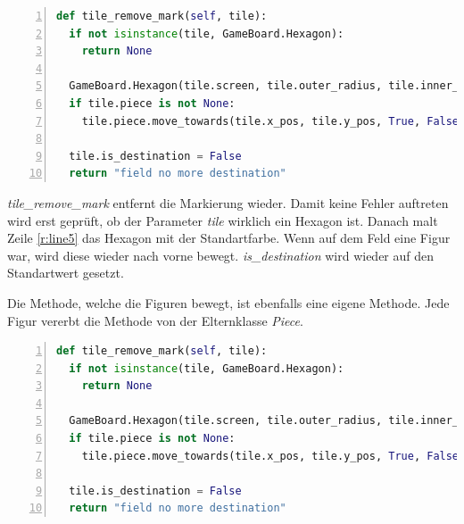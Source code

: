 \begin{lstlisting}[language=python,caption={Markierung aufheben},captionpos=b,label={lst:hexa:aufheben},numbers=left,frame=none,escapechar=|]
def tile_remove_mark(self, tile):
  if not isinstance(tile, GameBoard.Hexagon):
    return None

  GameBoard.Hexagon(tile.screen, tile.outer_radius, tile.inner_radius,tile.x_pos, tile.y_pos)|\label{r:line5}|
  if tile.piece is not None:
    tile.piece.move_towards(tile.x_pos, tile.y_pos, True, False)

  tile.is_destination = False
  return "field no more destination"
\end{lstlisting}

\textit{tile\_remove\_mark} entfernt die Markierung wieder. Damit keine Fehler auftreten wird erst geprüft, ob der Parameter \textit{tile} wirklich ein Hexagon ist. Danach malt Zeile \ref{r:line5} das Hexagon mit der Standartfarbe. Wenn auf dem Feld eine Figur war, wird diese wieder nach vorne bewegt. \textit{is\_destination} wird wieder auf den Standartwert gesetzt.

Die Methode, welche die Figuren bewegt, ist ebenfalls eine eigene Methode. Jede Figur vererbt die Methode von der Elternklasse \textit{Piece}.

\begin{lstlisting}[language=python,caption={Figur bewegen},captionpos=b,label={lst:hexa:bewegen},numbers=left,frame=none,escapechar=|]
def tile_remove_mark(self, tile):
  if not isinstance(tile, GameBoard.Hexagon):
    return None

  GameBoard.Hexagon(tile.screen, tile.outer_radius, tile.inner_radius,tile.x_pos, tile.y_pos)|\label{r:line5}|
  if tile.piece is not None:
    tile.piece.move_towards(tile.x_pos, tile.y_pos, True, False)

  tile.is_destination = False
  return "field no more destination"
\end{lstlisting}

